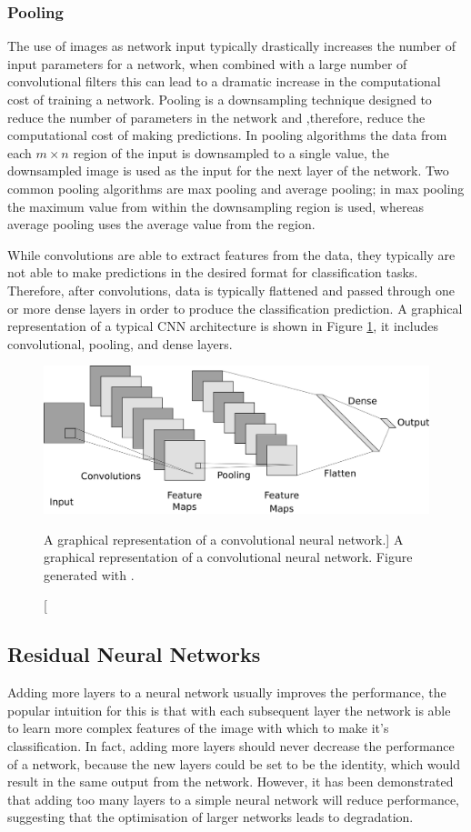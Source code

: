 \subsubsection*{Pooling}
The use of images as network input typically drastically increases the number of
input parameters for a network, when combined with a large number of
convolutional filters this can lead to a dramatic increase in the computational
cost of training a network. Pooling\cite{5537907} is a downsampling technique 
designed to reduce the number of parameters in the network and ,therefore, 
reduce the computational cost of making predictions. In pooling algorithms
the data from each $m \times n$ region of the input is downsampled to a single 
value, the downsampled image is used as the input for the next layer of the 
network. Two common pooling algorithms are max pooling and average pooling; in 
max pooling the maximum value from within the downsampling region is used, 
whereas average pooling uses the average value from the region.

\bigskip
\noindent
While convolutions are able to extract features from the data, they typically
are not able to make predictions in the desired format for classification tasks.
Therefore, after convolutions, data is typically flattened and passed through
one or more dense layers in order to produce the classification prediction. A
graphical representation of a typical CNN architecture is shown in Figure
\ref{fig:cnn_layer}, it includes convolutional, pooling, and dense layers.
\begin{figure}
	\centering
	\includegraphics[width = \textwidth]{figures/cnn_layer.png}
	\caption
	[A graphical representation of a convolutional neural network.]
	{ A graphical representation of a convolutional neural network. Figure
	generated with \cite{cnn_diagrams}.}
	\label{fig:cnn_layer}
\end{figure}

\subsection{Residual Neural Networks}
Adding more layers to a neural network usually improves the performance, the
popular intuition for this is that with each subsequent layer the network is
able to learn more complex features of the image with which to make it's
classification. In fact, adding more layers should never decrease the 
performance of a network, because the new layers could be set to be the 
identity, which would result in the same output from the network. However, it 
has been demonstrated that adding too many layers to a simple neural network 
will reduce performance, suggesting that the optimisation of
larger networks leads to degradation\cite{He_2016_CVPR}.

